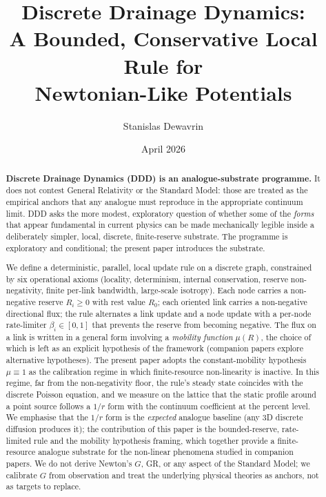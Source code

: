 \documentclass[11pt,a4paper]{article}
\title{\textbf{Discrete Drainage Dynamics:\\
A Bounded, Conservative Local Rule for\\
Newtonian-Like Potentials}}
\author[1]{Stanislas Dewavrin}
\affil[1]{Independent researcher \\ \texttt{dewavrin.iphone@gmail.com}}
\date{April 2026}
\begin{document}
\maketitle

\begin{abstract}
\noindent
\textbf{Discrete Drainage Dynamics (DDD) is an analogue-substrate
programme.} It does not contest General Relativity or the
Standard Model: those are treated as the empirical anchors that
any analogue must reproduce in the appropriate continuum limit.
DDD asks the more modest, exploratory question of whether some
of the \emph{forms} that appear fundamental in current physics
can be made mechanically legible inside a deliberately simpler,
local, discrete, finite-reserve substrate. The programme is
exploratory and conditional; the present paper introduces the
substrate.

We define a deterministic, parallel, local update rule on a
discrete graph, constrained by six operational axioms (locality,
determinism, internal conservation, reserve non-negativity,
finite per-link bandwidth, large-scale isotropy). Each node
carries a non-negative reserve $R_i \ge 0$ with rest value
$R_0$; each oriented link carries a non-negative directional
flux; the rule alternates a link update and a node update with
a per-node rate-limiter $\beta_i \in [0,1]$ that prevents the
reserve from becoming negative. The flux on a link is written
in a general form involving a \emph{mobility function}
$\mu(R)$, the choice of which is left as an explicit hypothesis
of the framework (companion papers explore alternative
hypotheses). The present paper adopts the constant-mobility
hypothesis $\mu \equiv 1$ as the calibration regime in which
finite-resource non-linearity is inactive. In this regime, far
from the non-negativity floor, the rule's steady state coincides
with the discrete Poisson equation, and we measure on the
lattice that the static profile around a point source follows
a $1/r$ form with the continuum coefficient at the percent
level. We emphasise that the $1/r$ form is the \emph{expected}
analogue baseline (any 3D discrete diffusion produces it); the
contribution of this paper is the bounded-reserve, rate-limited
rule and the mobility hypothesis framing, which together
provide a finite-resource analogue substrate for the non-linear
phenomena studied in companion papers. We do not derive
Newton's $G$, GR, or any aspect of the Standard Model; we
calibrate $G$ from observation and treat the underlying
physical theories as anchors, not as targets to replace.
\end{abstract}
\end{document}
